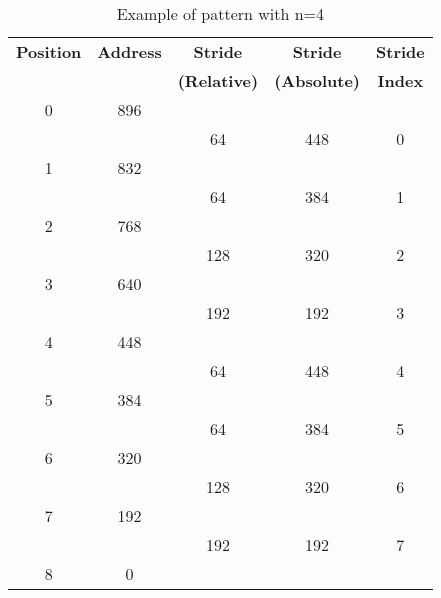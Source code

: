 \begin{table}
	\caption{Example of pattern with n=4}
	\label{table:pattern}
	\centering
	\begin{tabular}{c|c|c|c|c}
		\bfseries Position &
		\bfseries Address &
		\bfseries Stride &
		\bfseries Stride &
		\bfseries Stride \\
		& &
		\bfseries (Relative) &
		\bfseries (Absolute) &
		\bfseries Index \\
		\hline
		0 & 896   & & \\
		  &	& 64 & 448 & 0 \\
		1 & 832  & & \\
		  & & 64 & 384 & 1 \\
		2 & 768 & & \\
		  & & 128 & 320 & 2 \\
		3 & 640 & & \\
		  & & 192 & 192 & 3 \\
		4 & 448 & & \\
		  &	& 64 & 448 & 4 \\
		5 & 384 & & \\
		  &	& 64 & 384 & 5 \\
		6 & 320 & & \\
		  &	& 128 & 320 & 6 \\
		7 & 192 & & \\
		  &	& 192 & 192 & 7 \\
		8 & 0 & & \\
	\end{tabular}
\end{table}
